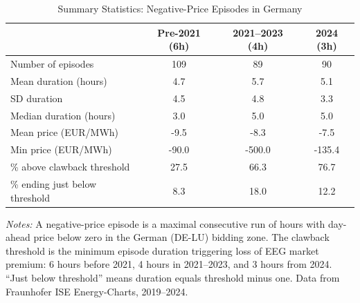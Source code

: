 \begin{table}[t]
\centering
\caption{Summary Statistics: Negative-Price Episodes in Germany}
\label{tab:summary}
\begin{tabular}{lccc}
\hline\hline
 & Pre-2021 (6h) & 2021--2023 (4h) & 2024 (3h) \\
\hline
Number of episodes & 109 & 89 & 90 \\
Mean duration (hours) & 4.7 & 5.7 & 5.1 \\
SD duration & 4.5 & 4.8 & 3.3 \\
Median duration (hours) & 3.0 & 5.0 & 5.0 \\
Mean price (EUR/MWh) & -9.5 & -8.3 & -7.5 \\
Min price (EUR/MWh) & -90.0 & -500.0 & -135.4 \\
\% above clawback threshold & 27.5 & 66.3 & 76.7 \\
\% ending just below threshold & 8.3 & 18.0 & 12.2 \\
\hline\hline
\end{tabular}
\begin{tablenotes}[flushleft]
\footnotesize
\item \textit{Notes:} A negative-price episode is a maximal consecutive run of hours with day-ahead price below zero in the German (DE-LU) bidding zone. The clawback threshold is the minimum episode duration triggering loss of EEG market premium: 6 hours before 2021, 4 hours in 2021--2023, and 3 hours from 2024. ``Just below threshold'' means duration equals threshold minus one. Data from Fraunhofer ISE Energy-Charts, 2019--2024.
\end{tablenotes}
\end{table}
